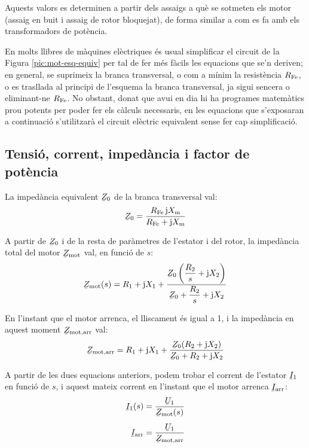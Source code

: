 Aquests valors es determinen a partir dels assaigs a què se sotmeten els motor (assaig en buit i assaig de rotor bloquejat), de forma similar a com es fa amb els transformadors de potència.

En molts llibres de màquines elèctriques és usual simplificar el circuit de la Figura  \vref{pic:mot-esq-equiv} per tal de fer més fàcils les equacions que se'n deriven; en general, se suprimeix la branca transversal, o com a mínim la resistència $R_\mathrm{Fe}$, o es trasllada al principi de l'esquema la branca transversal, ja sigui sencera o eliminant-ne  $R_\mathrm{Fe}$. No obstant, donat que avui en dia hi ha programes matemàtics prou potents per poder fer els càlculs necessaris, en les equacions que s'exposaran a continuació s'utilitzarà el circuit elèctric equivalent sense fer cap simplificació.

\subsection{Tensió, corrent, impedància i factor de potència}\label{sec:mot-u-c-i}

La impedància equivalent $\cmplx{Z}_0$ de la branca transversal val:
\begin{equation}
    \cmplx{Z}_0 = \frac{R\ped{Fe} \, \ju X\ped{m}}{ R\ped{Fe} + \ju X\ped{m}}\label{eq:mot-Z0}
\end{equation}

A partir de $\cmplx{Z}_0$ i de la resta de paràmetres de l'estator i del rotor, la impedància total del motor $\cmplx{Z}\ped{mot}$ val,  en funció de $s$:
\begin{equation}\index{motors d'inducció!impedància}
    \cmplx{Z}\ped{mot}(s) = R_1 + \ju X_1 + \frac{\cmplx{Z}_0 \left( \dfrac{R_2}{s} + \ju X_2\right)}{\cmplx{Z}_0 +  \dfrac{R_2}{s} + \ju X_2}\label{eq:mot-Zmot}
\end{equation}

En l'instant que el motor arrenca, el lliscament és igual a 1, i la impedància en aquest moment $\cmplx{Z}\ped{mot,arr}$ val:
\begin{equation}
    \cmplx{Z}\ped{mot,arr} = R_1 + \ju X_1 + \frac{\cmplx{Z}_0 ( R_2 + \ju X_2)}{\cmplx{Z}_0 +  R_2 + \ju X_2}\label{eq:z-mot-arr}
\end{equation}

A partir de les dues equacions anteriors, podem trobar el corrent de l'estator  $\cmplx{I}_1$ en funció de $s$, i aquest mateix corrent en l'instant que el motor arrenca $\cmplx{I}\ped{arr}$:
\begin{subequations}\index{motors d'inducció!corrent d'arrencada}\index{motors d'inducció!corrent}
\begin{align}
    \cmplx{I}_1(s) &= \frac{\cmplx{U}_1}{\cmplx{Z}\ped{mot}(s)}\label{eq:I1-mot} \\[1ex]
    \cmplx{I}\ped{arr} &= \frac{\cmplx{U}_1}{\cmplx{Z}\ped{mot,arr}}
\end{align}
\end{subequations}

